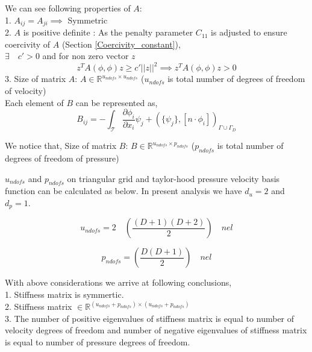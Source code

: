\documentclass[a4paper]{book}
\begin{document}
We can see following properties of $A$: 
\\
1. $A_{ij} = A_{ji} \implies$ Symmetric\\
2. $A$ is positive definite : As the penalty parameter $C_{11}$ is adjusted to ensure coercivity of $A$ (Section \ref{Coercivity_constant}),\\
$\exists \quad c' > 0 $ and for non zero vector $z$
\begin{equation}
z^T A( \phi , \phi ) z \geq c' || z ||^2 \implies z^T A( \phi , \phi ) z > 0
\end{equation}
3. Size of matrix $A$: $A \in \mathbb{R}^{u_{ndofs} \times u_{ndofs}}$ ($u_{ndofs}$ is total number of degrees of freedom of velocity)\\

Each element of $B$ can be represented as,\\
\begin{equation} \label{matrix B}
B_{ij} = - \int_\mathcal{T} \frac{\partial \phi_i}{\partial x_i} \psi_j + (\lbrace \psi_j \rbrace , [n \cdot \phi_i])_{\Gamma \cup \Gamma_D}
\end{equation}

We notice that, Size of matrix $B$: $B \in \mathbb{R}^{u_{ndofs} \times p_{ndofs}}$ ($p_{ndofs}$ is total number of degrees of freedom of pressure)

$u_{ndofs}$ and $p_{ndofs}$ on triangular grid and taylor-hood pressure velocity basis function can be calculated as below. In present analysis we have $d_u = 2$ and $d_p = 1$.

\begin{equation} \label{undofs}
u_{ndofs} = 2 \quad \left( \frac{(D+1)(D+2)}{2} \right) \quad nel
\end{equation}

\begin{equation} \label{pndofs}
p_{ndofs} = \left(\frac{D(D+1)}{2}\right) \quad nel
\end{equation}

With above considerations we arrive at following conclusions, \\

1. Stiffness matrix is symmertic. \\
2. Stiffness matrix $ \in \mathbb{R}^{(u_{ndofs} + p_{ndofs}) \times (u_{ndofs} + p_{ndofs})}$\\
3. The number of positive eigenvalues of stiffness matrix is equal to number of velocity degrees of freedom and number of negative eigenvalues of stiffness matrix is equal to number of pressure degrees of freedom.\\
\end{document}
